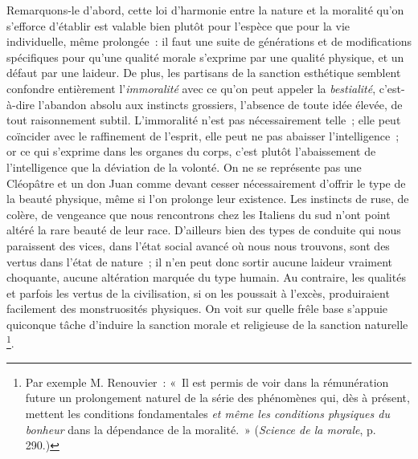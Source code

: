 \documentclass[french,twoside]{book} %
\begin{document}
Remarquons-le d’abord, cette loi d’harmonie entre la nature et la moralité qu’on s’efforce d’établir est valable bien plutôt pour l’espèce que pour la vie individuelle, même prolongée : il faut une suite de générations et de modifications spécifiques pour qu’une qualité morale s’exprime par une qualité physique, et un défaut par une laideur. De plus, les partisans de la sanction esthétique semblent confondre entièrement l’\emph{immoralité} avec ce qu’on peut appeler la \emph{bestialité}, c’est-à-dire l’abandon absolu aux instincts grossiers, l’absence de toute idée élevée, de tout raisonnement subtil. L’immoralité n’est pas nécessairement telle ; elle peut coïncider avec le raffinement de l’esprit, elle peut ne pas abaisser l’intelligence ; or ce qui s’exprime dans les organes du corps, c’est plutôt l’abaissement de l’intelligence que la déviation de la volonté. On ne se représente pas une Cléopâtre et un don Juan comme devant cesser nécessairement d’offrir le type de la beauté physique, même si l’on prolonge leur existence. Les instincts de ruse, de colère, de vengeance que nous rencontrons chez les Italiens du sud n’ont point altéré la rare beauté de leur race. D’ailleurs bien des types de conduite qui nous paraissent des vices, dans l’état social avancé où nous nous trouvons, sont des vertus dans l’état de nature ; il n’en peut donc sortir aucune laideur vraiment choquante, aucune altération marquée du type humain. Au contraire, les qualités et parfois les vertus de la civilisation, si on les poussait à l’excès, produiraient facilement des monstruosités physiques. On voit sur quelle frêle base s’appuie quiconque tâche d’induire la sanction morale et religieuse de la sanction naturelle \footnote{Par exemple M. Renouvier : « Il est permis de voir dans la rémunération future un prolongement naturel de la série des phénomènes qui, dès à présent, mettent les conditions fondamentales \emph{et même les conditions physiques du bonheur} dans la dépendance de la moralité. » (\emph{Science de la morale}, p. 290.)}.
\end{document}
